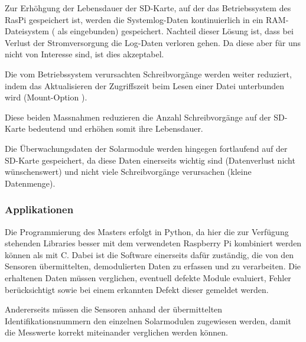 Zur Erh\"ohgung der  Lebensdauer der SD-Karte, auf der  das Betriebssystem des
RasPi  gespeichert  ist,  werden  die Systemlog-Daten  kontinuierlich  in  ein
RAM-Dateisystem  (  als    eingebunden)  gespeichert.
Nachteil  dieser  L\"osung  ist,  dass bei  Verlust  der  Stromversorgung  die
Log-Daten verloren  gehen. Da diese aber  f\"ur uns nicht von  Interesse sind,
ist dies akzeptabel.

Die vom Betriebssystem verursachten Schreibvorg\"ange werden weiter reduziert,
indem das  Aktualisieren der Zugriffszeit  beim Lesen einer  Datei unterbunden
wird (Mount-Option ).

Diese  beiden  Massnahmen  reduzieren  die Anzahl  Schreibvorg\"ange  auf  der
SD-Karte bedeutend und erh\"ohen somit ihre Lebensdauer.

Die \"Uberwachungsdaten  der Solarmodule  werden hingegen fortlaufend  auf der
SD-Karte  gespeichert, da  diese Daten  einerseits wichtig  sind (Datenverlust
nicht w\"unschenswert)  und nicht viele Schreibvorg\"ange  verursachen (kleine
Datenmenge).


\clearpage
\subsubsection{Applikationen}

Die Programmierung des Masters erfolgt in  Python, da hier die zur Verf\"ugung
stehenden Libraries besser mit dem  verwendeten Raspberry Pi kombiniert werden
k\"onnen als mit C. Dabei ist die Software einerseits daf\"ur zust\"andig, die
von  den Sensoren  \"ubermittelten,  demodulierten Daten  zu  erfassen und  zu
verarbeiten. Die  erhaltenen  Daten  m\"ussen  verglichen,  eventuell  defekte
Module  evaluiert, Fehler  ber\"ucksichtigt sowie  bei einem  erkannten Defekt
dieser gemeldet werden.

Andererseits    m\"ussen    die    Sensoren   anhand    der    \"ubermittelten
Identifikationsnummern den einzelnen Solarmodulen zugewiesen werden, damit die
Messwerte korrekt miteinander verglichen werden k\"onnen.
